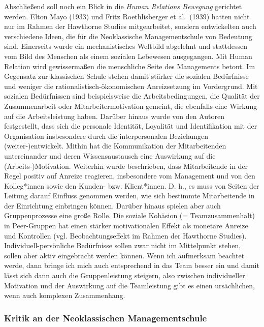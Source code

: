 \documentclass[
  letterpaper,
]{book}
\begin{document}
Abschließend soll noch ein Blick in die \emph{Human Relations Bewegung}
gerichtet werden. Elton Mayo (1933) und Fritz Roethlisberger et
al.~(1939) hatten nicht nur im Rahmen der Hawthorne Studies
mitgearbeitet, sondern entwickelten auch verschiedene Ideen, die für die
Neoklassische Managementschule von Bedeutung sind. Einerseits wurde ein
mechanistisches Weltbild abgelehnt und stattdessen vom Bild des Menschen
als einem sozialen Lebewesen ausgegangen. Mit Human Relation wird
gewissermaßen die menschliche Seite des Managements betont. Im Gegensatz
zur klassischen Schule stehen damit stärker die sozialen Bedürfnisse und
weniger die rationalistisch-ökonomischen Anreizsetzung im Vordergrund.
Mit sozialen Bedürfnissen sind beispielsweise die Arbeitsbedingungen,
die Qualität der Zusammenarbeit oder Mitarbeitermotivation gemeint, die
ebenfalls eine Wirkung auf die Arbeitsleistung haben. Darüber hinaus
wurde von den Autoren festgestellt, dass sich die personale Identität,
Loyalität und Identifikation mit der Organisation insbesondere durch die
interpersonalen Beziehungen (weiter-)entwickelt. Mithin hat die
Kommunikation der Mitarbeitenden untereinander und deren
Wissensaustausch eine Auswirkung auf die (Arbeits-)Motivation. Weiterhin
wurde beschrieben, dass Mitarbeitende in der Regel positiv auf Anreize
reagieren, insbesondere vom Management und von den Kolleg*innen sowie
den Kunden- bzw. Klient*innen. D. h., es muss von Seiten der Leitung
darauf Einfluss genommen werden, wie sich bestimmte Mitarbeitende in der
Einrichtung einbringen können. Darüber hinaus spielen aber auch
Gruppenprozesse eine große Rolle. Die soziale Kohäsion (=
Teamzusammenhalt) in Peer-Gruppen hat einen stärker motivationalen
Effekt als monetäre Anreize und Kontrollen (vgl. Beobachtungseffekt im
Rahmen der Hawthorne Studies). Individuell-persönliche Bedürfnisse
sollen zwar nicht im Mittelpunkt stehen, sollen aber aktiv eingebracht
werden können. Wenn ich aufmerksam beachtet werde, dann bringe ich mich
auch entsprechend in das Team besser ein und damit lässt sich dann auch
die Gruppenleistung steigern, also zwischen individueller Motivation und
der Auswirkung auf die Teamleistung gibt es einen ursächlichen, wenn
auch komplexen Zusammenhang.

\subsubsection{Kritik an der Neoklassischen
Managementschule}\label{kritik-an-der-neoklassischen-managementschule}
\end{document}
